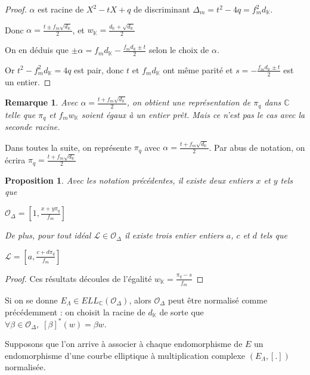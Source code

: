 \documentclass{article}
\newcommand{\C}[0]{\mathbb{C}}
\newcommand{\K}[0]{\mathbb{K}}
\newcommand{\OR}[0]{\mathcal{O}}
\newcommand{\LR}[0]{\mathcal{L}}
\newtheorem{Prop}[The]{Proposition}
\newtheorem{Rem}[The]{Remarque}
\begin{document}
\begin{proof}
	
	$\alpha$ est racine de $X^{2} - tX + q$ de discriminant $\Delta_{m} = t^{2} - 4q = f_{m}^{2}d_{\K}$.
	
	Donc $\alpha = \frac{t\pm f_{m}\sqrt{d_{\K}}}{2}$, et $w_{\K} = \frac{d_{\K} + \sqrt{d_{\K}}}{2}$
	
	On en déduis que  $\pm\alpha = f_{m}d_{\K} - \frac{f_{m}d_{\K} \pm t}{2}$ selon le choix de $\alpha$.
	
	Or $t^{2} - f_{m}^{2}d_{\K} = 4q$ est pair, donc $t$ et $f_{m}d_{\K}$ ont même parité et $s = -\frac{f_{m}d_{\K} \pm t}{2}$ est un entier.
	
\end{proof}

\begin{Rem}
	Avec $\alpha = \frac{t + f_{m}\sqrt{d_{\K}}}{2}$, on obtient une représentation de $\pi_{q}$ dans $\C$ telle que $\pi_{q}$ et $f_{m}w_{\K}$ soient égaux à un entier prêt. Mais ce n'est pas le cas avec la seconde racine.
\end{Rem}

Dans toutes la suite, on représente $\pi_{q}$ avec $\alpha = \frac{t + f_{m}\sqrt{d_{\K}}}{2}$. Par abus de notation, on écrira $\pi_{q} = \frac{t + f_{m}\sqrt{d_{\K}}}{2}$

\begin{Prop}
	
	Avec les notation précédentes, il existe deux entiers $x$ et $y$ tels que
	
	 $\OR_{\Delta} = \left[ 1, \frac{x + y\pi_{q}}{f_{m}}\right] $
	
	De plus, pour tout idéal $\LR\in\OR_{\Delta}$ il existe trois entier entiers $a$, $c$ et $d$ tels que 
	
	$\LR = \left[ a, \frac{c + d\pi_{q}}{f_{m}}\right] $
	
\end{Prop}

\begin{proof}
	Ces résultats découles de l'égalité $w_{\K} = \frac{\pi_{q} - s}{f_{m}}$
\end{proof}
	

Si on se donne $E_{\Lambda}\in ELL_{\C}(\OR_{\Delta})$, alors $\OR_{\Delta} $ peut être normalisé comme précédemment : on choisit la racine de $d_{\K}$ de sorte que $\forall\beta\in\OR_{\Delta} ,\; [\beta]^{*}(w) = \beta w$.

Supposons que l'on arrive à associer à chaque endomorphisme de $E$ un endomorphisme d'une courbe elliptique à multiplication complexe $(E_{\Lambda},[.])$ normalisée. 
\end{document}
